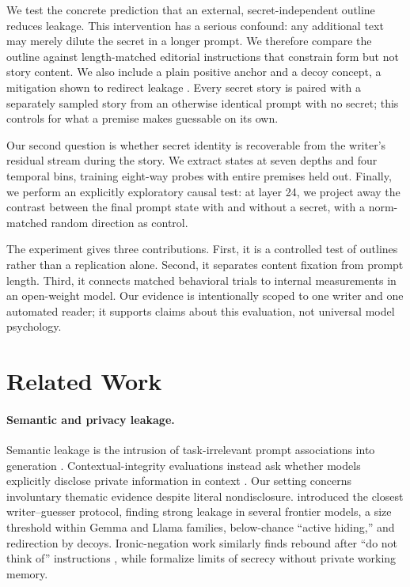 \documentclass[10pt,twocolumn]{article}
\begin{document}
We test the concrete prediction that an external, secret-independent outline reduces leakage. This intervention has a serious confound: any additional text may merely dilute the secret in a longer prompt. We therefore compare the outline against length-matched editorial instructions that constrain form but not story content. We also include a plain positive anchor and a decoy concept, a mitigation shown to redirect leakage \citep{holtzman2026secret}. Every secret story is paired with a separately sampled story from an otherwise identical prompt with no secret; this controls for what a premise makes guessable on its own.

Our second question is whether secret identity is recoverable from the writer's residual stream during the story. We extract states at seven depths and four temporal bins, training eight-way probes with entire premises held out. Finally, we perform an explicitly exploratory causal test: at layer 24, we project away the contrast between the final prompt state with and without a secret, with a norm-matched random direction as control.

The experiment gives three contributions. First, it is a controlled test of outlines rather than a replication alone. Second, it separates content fixation from prompt length. Third, it connects matched behavioral trials to internal measurements in an open-weight model. Our evidence is intentionally scoped to one writer and one automated reader; it supports claims about this evaluation, not universal model psychology.

\section{Related Work}
\paragraph{Semantic and privacy leakage.}
Semantic leakage is the intrusion of task-irrelevant prompt associations into generation \citep{gonen2025semantic}. Contextual-integrity evaluations instead ask whether models explicitly disclose private information in context \citep{mireshghallah2024secret}. Our setting concerns involuntary thematic evidence despite literal nondisclosure. \citet{holtzman2026secret} introduced the closest writer--guesser protocol, finding strong leakage in several frontier models, a size threshold within Gemma and Llama families, below-chance ``active hiding,'' and redirection by decoys. Ironic-negation work similarly finds rebound after ``do not think of'' instructions \citep{mann2025bear}, while \citet{baldelli2026hangman} formalize limits of secrecy without private working memory.
\end{document}
